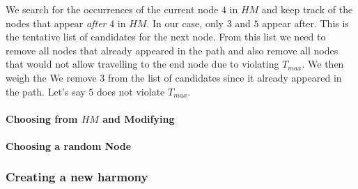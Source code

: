 We search for the occurrences of the current node $4$ in $HM$ and keep track of the nodes that appear \emph{after} $4$ in $HM$.
In our case, only $3$ and $5$ appear after.
This is the tentative list of candidates for the next node.
From this list we need to remove all nodes that already appeared in the path and also remove all nodes that would not allow travelling to the end node due to violating $T_{max}$.
We then weigh the 
We remove $3$ from the list of candidates since it already appeared in the path.
Let's say $5$ does not violate $T_{max}$.


\paragraph{Choosing from $HM$ and Modifying}


\paragraph{Choosing a random Node}


\subsubsection{Creating a new harmony}

